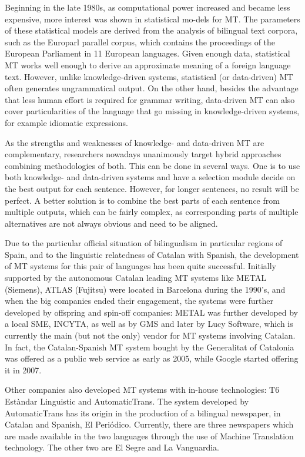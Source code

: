 \documentclass[]{../../metanetpaper}
\begin{document}
\begin{multicols}{2}
Beginning in the late 1980s, as computational power increased and became less expensive, more interest was shown in statistical mo-dels for MT. The parameters of these statistical models are derived from the analysis of bilingual text corpora, such as the Europarl parallel corpus, which contains the proceedings of the European Parliament in 11 European languages. Given enough data, statistical MT works well enough to derive an approximate meaning of a foreign language text. However, unlike knowledge-driven systems, statistical (or data-driven) MT often generates ungrammatical output. On the other hand, besides the advantage that less human effort is required for grammar writing, data-driven MT can also cover particularities of the language that go missing in knowledge-driven systems, for example idiomatic expressions. 

As the strengths and weaknesses of knowledge- and data-driven MT are complementary, researchers nowadays unanimously target hybrid approaches combining methodologies of both. This can be done in several ways. One is to use both knowledge- and data-driven systems and have a selection module decide on the best output for each sentence. However, for longer sentences, no result will be perfect. A better solution is to combine the best parts of each sentence from multiple outputs, which can be fairly complex, as corresponding parts of multiple alternatives are not always obvious and need to be aligned. 

Due to the particular official situation of bilingualism in particular regions of Spain, and to the linguistic relatedness of Catalan with Spanish, the development of MT systems for this pair of languages has been quite successful. Initially supported by the autonomous Catalan leading MT systems like METAL (Siemens), ATLAS (Fujitsu) were located in Barcelona during the 1990’s, and when the big companies ended their engagement, the systems were further developed by offspring and spin-off companies: METAL was further developed by a local SME, INCYTA, as well as by GMS and later by Lucy Software, which is currently the main (but not the only) vendor for MT systems involving Catalan. In fact, the Catalan-Spanish MT system  bought by the Generalitat of Catalonia was offered as a public web service as early as 2005, while Google started offering it in 2007. 

Other companies also developed MT systems with in-house technologies: T6 Estàndar Linguistic and AutomaticTrans. The system developed by AutomaticTrans has its origin in the production of a bilingual newspaper, in Catalan and Spanish, El Periódico. Currently, there are three newspapers which are made available in the two languages  through the use of Machine Translation technology. The other two are El Segre and La Vanguardia. 


\end{multicols}
\end{document}
